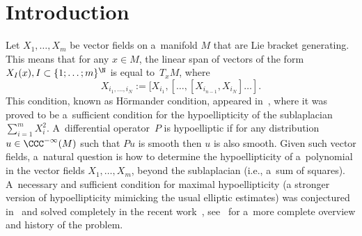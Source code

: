 \section{Introduction}

Let $X_1, \dots, X_m$ be vector fields on a~manifold $M$ that are Lie bracket generating. This means that for any $x \in M$, the linear span of vectors of the form $X_I(x), I\subset \{1;\dots;m\}^{\N}$ is equal to~$T_xM$, where
\[X_{i_1,\dots,i_N} := [X_{i_1},[\dots,[X_{i_{n-1}},X_{i_N}]\dots].
\]
This condition, known as H\"ormander condition, appeared in~\cite{Hormander}, where it was proved to be a~sufficient condition for the hypoellipticity of the sublaplacian $\sum_{i=1}^m X_i^2$. A~differential operator~$P$ is hypoelliptic if for any distribution $u \in \CCC^{-\infty}(M)$ such that $Pu$ is smooth then $u$ is also smooth.
Given such vector fields, a~natural question is how to determine the hypoellipticity of a~polynomial in the vector fields $X_1, \dots, X_m$, beyond the sublaplacian (i.e., a~sum of squares). A~necessary and sufficient condition for maximal hypoellipticity (a stronger version of hypoellipticity mimicking the usual elliptic estimates) was conjectured in~\cite{HelfferNourrigatPaper} and solved completely in the recent work~\cite{AMYMaximalHypoellipticity}, see~\cite{DebordBourbaki,HelfferNourrigatBook} for a~more complete overview and history of the problem.

